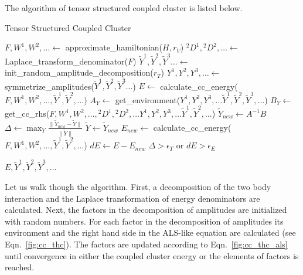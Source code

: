 The algorithm of tensor structured coupled cluster is listed below. 
%
\begin{algorithm}[H]
  \caption{Tensor Structured Coupled Cluster}\label{code:tcc_algorithm}
  \begin{algorithmic}[1] 
  \State $F, W^{1},W^{2},\ldots \gets$ approximate\_hamiltonian($H, r_{V}$)
  \State ${}^2D^1,{}^2D^{2},\ldots \gets$ 
Laplace\_transform\_denominator($F$)  
  \State $\tilde{Y}^1, \tilde{Y}^2, \tilde{Y}^3 \ldots \gets$ 
init\_random\_amplitude\_decomposition($r_{T}$) 
  \Repeat 
  \State $Y^1, Y^2, Y^3, \ldots \gets 
$ symmetrize\_amplitudes($\tilde{Y}^{1}, \tilde{Y}^{2}, \tilde{Y}^{3} \ldots$)
   \State $E \gets $ calculate\_cc\_energy($F, W^1, W^2, \ldots, 
\tilde{Y}^{1}, \tilde{Y}^{2}, \ldots$)
  \State $A_{Y} \gets $ get\_environment($Y^1, Y^2, Y^3, \ldots \tilde{Y}^1, 
\tilde{Y}^2, \tilde{Y}^3, \ldots$)
  \State $B_{Y} \gets $ get\_cc\_rhs($F, W^1, W^2, \ldots, {}^2D^{1}, 
{}^2D^{2}, \ldots Y^{1}, Y^{2}, Y^{3}, \ldots \tilde{Y}^{1}, \tilde{Y}^{2}, 
\ldots$) 
   \State $\tilde{Y}_{new} \gets A^{-1} B$
   \EndFor
   \State $\Delta \gets \max_{Y} \frac{\| \tilde{Y}_{new} - \tilde{Y} \|}{\|
\tilde{Y} \|}$
   \State $\tilde{Y} \gets \tilde{Y}_{new}$ 
   \State $E_{new} \gets $ calculate\_cc\_energy($F, W^1, W^2, \ldots, 
\tilde{Y}^{1}, \tilde{Y}^{2}, \ldots$)
   \State $dE \gets E - E_{new}$
   \Until $\Delta > \epsilon_{T}$ or $dE > \epsilon_{E}$ 
   
   \Return $E, \tilde{Y}^1, \tilde{Y}^2, \tilde{Y}^3, \ldots$
    \EndFunction
  \end{algorithmic}
\end{algorithm}
%
Let us walk though the algorithm. First, a 
decomposition of the two body interaction and the Laplace transformation of 
energy denominators are calculated. Next, the factors in the decomposition of 
amplitudes are initialized with random numbers. For each factor in the 
decomposition of amplitudes its environment and the right hand side in the 
ALS-like equation are calculated (see Eqn.~\ref{fig:cc_thc}). The factors  are 
updated according to Eqn.~\ref{fig:cc_thc_als} until convergence in either the 
coupled cluster energy or the elements of factors is reached.

